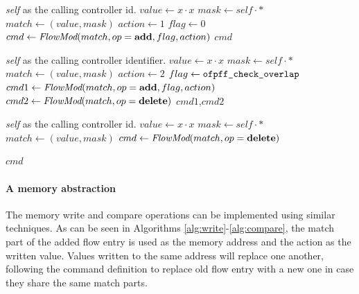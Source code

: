 \documentclass[conference]{sigcomm-alternate}
\newcommand{\concat}[0]{\cdot}
\newcommand{\claimcheck}{check\xspace}
\newcommand{\compare}{compare\xspace}
\newcommand{\memwrite}{write\xspace}
\newcommand{\add}{\textbf{add}\xspace}
\newcommand{\dele}{\textbf{delete}\xspace}
\newcommand{\checko}{\texttt{check\_overlap}\xspace}
\begin{document}
\begin{algorithm}[H]
    \caption{$\textit{claim}(x)$}
    \label{alg:claim}
    \begin{algorithmic}[1]
    \Require \emph{self} as the calling controller id.
    		\State $value \gets x\concat x$
    		\State $mask \gets self\concat \texttt{*}$
	    	\State $match \gets (value,mask)$
    		\State $action \gets 1$
    		\State $flag \gets 0$
    		\State $cmd\gets \emph{FlowMod}(match, op = \add, flag, action) $
			\Return $cmd$
    \end{algorithmic}
\end{algorithm}

\begin{algorithm}[H]
    \caption{$\textit{\claimcheck}(x)$}
    \label{alg:check}
    \begin{algorithmic}[1]
    \Require \emph{self} as the calling controller identifier.
    		\State $value \gets x\concat x$
    		\State $mask \gets self\concat \texttt{*}$
    		\State $match \gets (value,mask)$
    		\State $action \gets 2$
    		\State $flag \gets \texttt{ofpff\_\checko}$
    		\State $cmd1\gets \emph{FlowMod}(match, op = \add, flag, action) $
    		\State $cmd2\gets \emph{FlowMod}(match, op = \dele) $
			\Return $cmd1$,$cmd2$
    \end{algorithmic}
\end{algorithm}

\begin{algorithm}[H]
    \caption{$\textit{unclaim}(x)$}
    \label{alg:unclaim}
    \begin{algorithmic}[1]
    \Require \emph{self} as the calling controller id.
    		\State $value \gets x\concat x$
    		\State $mask \gets self\concat \texttt{*}$
    		\State $match \gets (value,mask)$
    		\State $cmd\gets \emph{FlowMod}(match, op=\dele) $
    	
			
			\Return $cmd$
    \end{algorithmic}
\end{algorithm}

\paragraph{A memory abstraction}
The memory \memwrite and \compare
 operations can be implemented using similar techniques.
 As can be seen in Algorithms \ref{alg:write}-\ref{alg:compare},
  the match part of the added flow entry is used as the memory address and the action as
  the written value. Values written to the same address will replace one another,
following the command definition to replace old flow entry with a new one in case they
share the same match parts.
\end{document}

